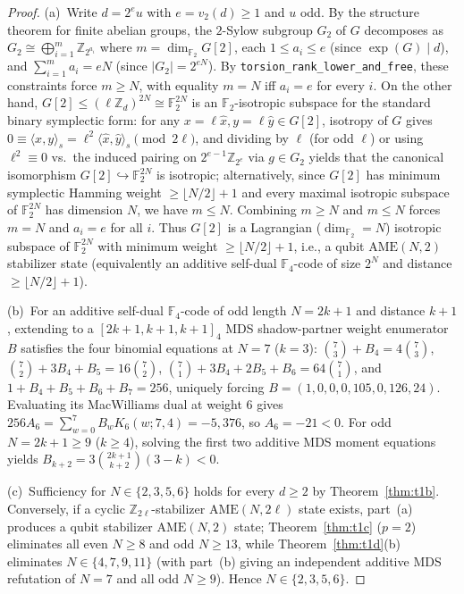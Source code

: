 \documentclass[11pt,reqno]{amsart}
\theoremstyle{definition}
\newcommand{\ZZ}{\mathbb{Z}}
\newcommand{\FF}{\mathbb{F}}
\newcommand{\AME}{\mathrm{AME}}
\newcommand{\lid}[1]{{\footnotesize\nolinkurl{#1}}}
\begin{document}
\begin{proof}
(a)~Write $d = 2^e u$ with $e = v_2(d) \ge 1$ and $u$ odd. By the structure theorem for
finite abelian groups, the $2$-Sylow subgroup $G_2$ of $G$ decomposes as
$G_2 \cong \bigoplus_{i=1}^m \ZZ_{2^{a_i}}$ where $m = \dim_{\FF_2} G[2]$, each
$1 \le a_i \le e$ (since $\exp(G) \mid d$), and $\sum_{i=1}^m a_i = e N$ (since
$|G_2| = 2^{eN}$). By \lid{torsion_rank_lower_and_free}, these constraints force
$m \ge N$, with equality $m = N$ iff $a_i = e$ for every $i$. On the other hand,
$G[2] \le (\ell \ZZ_d)^{2N} \cong \FF_2^{2N}$ is an $\FF_2$-isotropic subspace for the
standard binary symplectic form: for any $x = \ell\hat{x}, y = \ell\hat{y} \in G[2]$,
isotropy of $G$ gives $0 \equiv \langle x, y\rangle_s = \ell^2 \langle \hat{x}, \hat{y}
\rangle_s \pmod{2\ell}$, and dividing by $\ell$ (for odd $\ell$) or using $\ell^2 \equiv
0$ vs.\ the induced pairing on $2^{e-1}\ZZ_{2^e}$ via $g \in G_2$ yields that the
canonical isomorphism $G[2] \hookrightarrow \FF_2^{2N}$ is isotropic; alternatively,
since $G[2]$ has minimum symplectic Hamming weight $\ge \lfloor N/2 \rfloor + 1$ and
every maximal isotropic subspace of $\FF_2^{2N}$ has dimension $N$, we have $m \le N$.
Combining $m \ge N$ and $m \le N$ forces $m = N$ and $a_i = e$ for all $i$. Thus $G[2]$
is a Lagrangian ($\dim_{\FF_2} = N$) isotropic subspace of $\FF_2^{2N}$ with minimum
weight $\ge \lfloor N/2 \rfloor + 1$, i.e., a qubit $\AME(N, 2)$ stabilizer state (equivalently
an additive self-dual $\FF_4$-code of size $2^N$ and distance $\ge \lfloor N/2 \rfloor + 1$).

(b)~For an additive self-dual $\FF_4$-code of odd length $N = 2k+1$ and distance $k+1$,
extending to a $[2k+1, k+1, k+1]_4$ MDS shadow-partner weight enumerator $B$ satisfies
the four binomial equations at $N = 7$ ($k = 3$): $\binom{7}{3} + B_4 = 4\binom{7}{3}$,
$\binom{7}{2} + 3B_4 + B_5 = 16\binom{7}{2}$, $\binom{7}{1} + 3B_4 + 2B_5 + B_6 =
64\binom{7}{1}$, and $1 + B_4 + B_5 + B_6 + B_7 = 256$, uniquely forcing
$B = (1, 0, 0, 0, 105, 0, 126, 24)$. Evaluating its MacWilliams dual at weight $6$ gives
$256 A_6 = \sum_{w=0}^7 B_w K_6(w; 7, 4) = -5{,}376$, so $A_6 = -21 < 0$. For odd
$N = 2k+1 \ge 9$ ($k \ge 4$), solving the first two additive MDS moment equations yields
$B_{k+2} = 3\binom{2k+1}{k+2}(3-k) < 0$.

(c)~Sufficiency for $N \in \{2, 3, 5, 6\}$ holds for every $d \ge 2$ by
Theorem~\ref{thm:t1b}. Conversely, if a cyclic $\ZZ_{2\ell}$-stabilizer $\AME(N, 2\ell)$
state exists, part~(a) produces a qubit stabilizer $\AME(N, 2)$ state; Theorem~\ref{thm:t1c}
($p=2$) eliminates all even $N \ge 8$ and odd $N \ge 13$, while Theorem~\ref{thm:t1d}(b)
eliminates $N \in \{4, 7, 9, 11\}$ (with part~(b) giving an independent additive MDS
refutation of $N=7$ and all odd $N \ge 9$). Hence $N \in \{2, 3, 5, 6\}$.


\end{proof}
\end{document}
